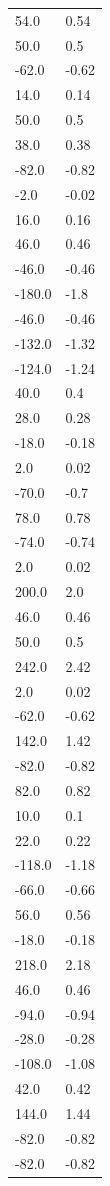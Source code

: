 \begin{longtable}{ll}
54.0 & 0.54 \\
50.0 & 0.5 \\
-62.0 & -0.62 \\
14.0 & 0.14 \\
50.0 & 0.5 \\
38.0 & 0.38 \\
-82.0 & -0.82 \\
-2.0 & -0.02 \\
16.0 & 0.16 \\
46.0 & 0.46 \\
-46.0 & -0.46 \\
-180.0 & -1.8 \\
-46.0 & -0.46 \\
-132.0 & -1.32 \\
-124.0 & -1.24 \\
40.0 & 0.4 \\
28.0 & 0.28 \\
-18.0 & -0.18 \\
2.0 & 0.02 \\
-70.0 & -0.7 \\
78.0 & 0.78 \\
-74.0 & -0.74 \\
2.0 & 0.02 \\
200.0 & 2.0 \\
46.0 & 0.46 \\
50.0 & 0.5 \\
242.0 & 2.42 \\
2.0 & 0.02 \\
-62.0 & -0.62 \\
142.0 & 1.42 \\
-82.0 & -0.82 \\
82.0 & 0.82 \\
10.0 & 0.1 \\
22.0 & 0.22 \\
-118.0 & -1.18 \\
-66.0 & -0.66 \\
56.0 & 0.56 \\
-18.0 & -0.18 \\
218.0 & 2.18 \\
46.0 & 0.46 \\
-94.0 & -0.94 \\
-28.0 & -0.28 \\
-108.0 & -1.08 \\
42.0 & 0.42 \\
144.0 & 1.44 \\
-82.0 & -0.82 \\
-82.0 & -0.82 \\

\end{longtable}

